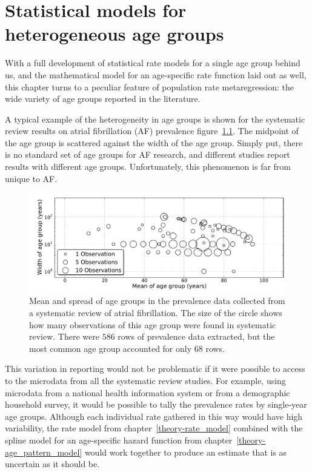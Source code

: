 \chapter{Statistical models for heterogeneous age groups}
\label{chap:age_group_model}
With a full development of statistical rate models for a single age group
behind us, and the mathematical model for an age-specific rate
function laid out as well, this chapter turns to a peculiar feature of
population rate metaregression: the wide variety of age groups reported
in the literature.

A typical example of the heterogeneity in age groups is shown for
the systematic review results on atrial fibrillation (AF)
prevalence\cite{vos_global_2012}
figure~\ref{age-group-model-af-age-groups}.  The midpoint of the
age group is scattered against the width of the age group.  Simply put,
there is no standard set of age groups for AF research, and different
studies report results with different age groups. Unfortunately, this
phenomenon is far from unique to AF.

\begin{figure}[h]
\begin{center}
\includegraphics[width=\textwidth]{af_age_groups_scatter.pdf}
\end{center}
\caption[Mean and spread of age groups collected from a
  systematic review of atrial fibrillation.]{Mean and spread
  of age groups in the prevalence data
  collected from a systematic review of atrial fibrillation. The
  size of the circle shows how many observations of this age group
  were found in systematic review. There were
  $586$ rows of prevalence data
  extracted, but the most common age group accounted for only
  $68$ rows.}
\label{age-group-model-af-age-groups}
\end{figure}

This variation in reporting would not be problematic if it were possible to access
to the microdata from all the systematic review studies.  For
example, using microdata from a national health information system or
from a demographic household survey, it would be possible to tally the
prevalence rates by single-year age groups.  Although each individual
rate gathered in this way would have high variability, the rate model
from chapter~\ref{theory-rate_model} combined with the spline model
for an age-specific hazard function from chapter~\ref{theory-age_pattern_model} would
work together to produce an estimate that is as uncertain as it should be.

